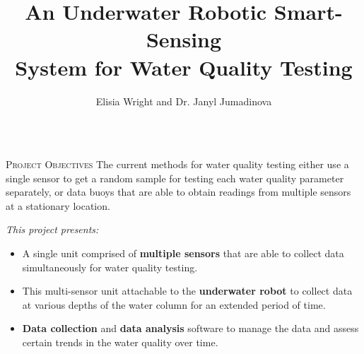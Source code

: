 \documentclass[final,t]{beamer}
\title[]{An Underwater Robotic Smart-Sensing \\ System for Water Quality Testing }
\author[Wright]{ Elisia Wright and Dr. Janyl Jumadinova}
\institute{ Department of Computer Science, Allegheny College \\ Meadville, PA}
\begin{document}
    \begin{frame}{}
        \vspace*{-6mm}
        \begin{columns}[t]
        	\begin{column}{1\linewidth}

                \begin{alertblock}{\textsc{Project Objectives}}
                    \vspace*{6mm}
                    The current methods for water quality testing either use  a single
                    sensor to get a random sample for testing each water quality 											parameter separately, or data buoys that are able to obtain
                    readings from multiple sensors at a stationary location.
                    \vspace{3mm}

                    \emph{This project presents:}
                    \begin{itemize}
                        \item A single unit comprised of \textbf{multiple sensors} that are able to collect data simultaneously for water quality testing.
                        \item This multi-sensor unit attachable to the \textbf{underwater robot} to collect data at various depths of the water column for an extended period of time.
                        \item \textbf{Data collection} and \textbf{data analysis} software to manage the data and assess certain trends in the water quality over time.
                    \end{itemize}
                    \vspace*{6mm}
                \end{alertblock}
			\end{column}
		\end{columns}



\end{frame}
\end{document}
